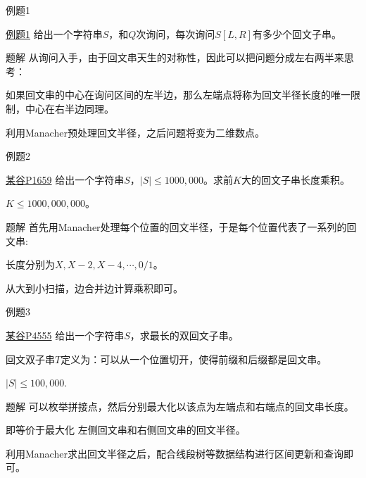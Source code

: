 \documentclass{ctexbeamer}		%
\begin{document}
\begin{frame}{例题1}
    
\begin{block}{\href{https://ac.nowcoder.com/acm/contest/5633/F}{例题1}}
给出一个字符串$S$，和$Q$次询问，每次询问$S[L,R]$有多少个回文子串。
\end{block}

\pause
\begin{block}{题解}
从询问入手，由于回文串天生的对称性，因此可以把问题分成左右两半来思考：

\pause

如果回文串的中心在询问区间的左半边，那么左端点将称为回文半径长度的唯一限制，中心在右半边同理。

\pause

利用Manacher预处理回文半径，之后问题将变为二维数点。
\end{block}

\end{frame}

\begin{frame}{例题2}
    
\begin{block}{\href{https://www.luogu.com.cn/problem/P1659}{某谷P1659}}
给出一个字符串$S$，$|S| \leq 1000, 000$。求前$K$大的回文子串长度乘积。

$K \leq 1000, 000, 000$。
\end{block}

\pause

\begin{block}{题解}
首先用Manacher处理每个位置的回文半径，于是每个位置代表了一系列的回文串:

长度分别为$X, X -2, X -4, \cdots, 0/1$。

从大到小扫描，边合并边计算乘积即可。

\end{block}
\end{frame}


\begin{frame}{例题3}

\begin{block}{\href{https://www.luogu.com.cn/problem/P4555}{某谷P4555}}
给出一个字符串$S$，求最长的双回文子串。

回文双子串$T$定义为：可以从一个位置切开，使得前缀和后缀都是回文串。

$|S| \leq 100,000$.
\end{block}
\pause

\begin{block}{题解}
可以枚举拼接点，然后分别最大化以该点为左端点和右端点的回文串长度。

即等价于最大化 左侧回文串和右侧回文串的回文半径。

\pause

利用Manacher求出回文半径之后，配合线段树等数据结构进行区间更新和查询即可。
\end{block}
    
\end{frame}
\end{document}
